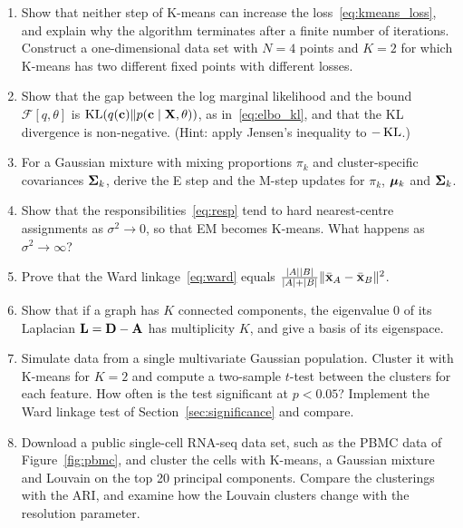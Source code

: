 \begin{enumerate}
  \item Show that neither step of K-means can increase the loss~\eqref{eq:kmeans_loss}, and explain why the algorithm terminates after a finite number of iterations. Construct a one-dimensional data set with $N=4$ points and $K=2$ for which K-means has two different fixed points with different losses.
  \item Show that the gap between the log marginal likelihood and the bound $\mathcal{F}[q,\theta]$ is $\operatorname{KL}(q(\mathbf{c})\|p(\mathbf{c}\mid\mathbf{X},\theta))$, as in~\eqref{eq:elbo_kl}, and that the KL divergence is non-negative. (Hint: apply Jensen's inequality to $-\operatorname{KL}$.)
  \item For a Gaussian mixture with mixing proportions $\pi_k$ and cluster-specific covariances $\boldsymbol{\Sigma}_k$, derive the E step and the M-step updates for $\pi_k$, $\boldsymbol{\mu}_k$ and $\boldsymbol{\Sigma}_k$.
  \item Show that the responsibilities~\eqref{eq:resp} tend to hard nearest-centre assignments as $\sigma^2\to 0$, so that EM becomes K-means. What happens as $\sigma^2\to\infty$?
  \item \label{ex:ward} Prove that the Ward linkage~\eqref{eq:ward} equals $\frac{|A||B|}{|A|+|B|}\|\bar{\mathbf{x}}_A-\bar{\mathbf{x}}_B\|^2$.
  \item Show that if a graph has $K$ connected components, the eigenvalue 0 of its Laplacian $\mathbf{L}=\mathbf{D}-\mathbf{A}$ has multiplicity $K$, and give a basis of its eigenspace.
  \item Simulate data from a single multivariate Gaussian population. Cluster it with K-means for $K=2$ and compute a two-sample $t$-test between the clusters for each feature. How often is the test significant at $p<0.05$? Implement the Ward linkage test of Section~\ref{sec:significance} and compare.
  \item Download a public single-cell RNA-seq data set, such as the PBMC data of Figure~\ref{fig:pbmc}, and cluster the cells with K-means, a Gaussian mixture and Louvain on the top 20 principal components. Compare the clusterings with the ARI, and examine how the Louvain clusters change with the resolution parameter.
\end{enumerate}
